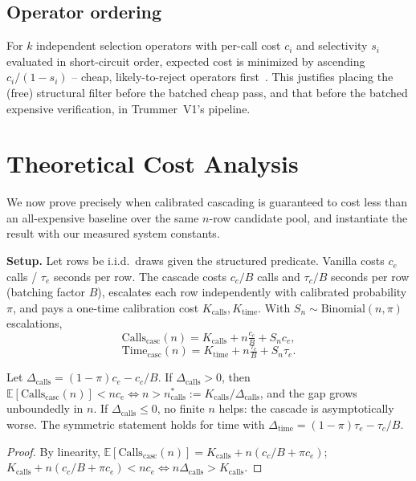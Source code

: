 \documentclass[sigconf,natbib=false]{acmart}
\begin{document}
\subsection{Operator ordering}
For $k$ independent selection operators with per-call cost $c_i$ and selectivity $s_i$ evaluated in short-circuit order, expected cost is minimized by ascending $c_i/(1-s_i)$ -- cheap, likely-to-reject operators first~\cite{eleet}. This justifies placing the (free) structural filter before the batched cheap pass, and that before the batched expensive verification, in Trummer~V1's pipeline.

\section{Theoretical Cost Analysis}
\label{sec:asymptotic-dominance}

We now prove precisely when calibrated cascading is guaranteed to cost less than an all-expensive baseline over the same $n$-row candidate pool, and instantiate the result with our measured system constants.

\textbf{Setup.} Let rows be i.i.d.\ draws given the structured predicate. Vanilla costs $c_e$ calls / $\tau_e$ seconds per row. The cascade costs $c_c/B$ calls and $\tau_c/B$ seconds per row (batching factor $B$), escalates each row independently with calibrated probability $\pi$, and pays a one-time calibration cost $K_{\mathrm{calls}}, K_{\mathrm{time}}$. With $S_n\sim\mathrm{Binomial}(n,\pi)$ escalations,
\[
  \mathrm{Calls}_{\mathrm{casc}}(n) = K_{\mathrm{calls}} + n\tfrac{c_c}{B} + S_n c_e,
\]
\[
  \mathrm{Time}_{\mathrm{casc}}(n) = K_{\mathrm{time}} + n\tfrac{\tau_c}{B} + S_n \tau_e.
\]

\begin{proposition}
\label{prop:crossover}
Let $\Delta_{\mathrm{calls}} = (1-\pi)c_e - c_c/B$. If $\Delta_{\mathrm{calls}}>0$, then $\mathbb E[\mathrm{Calls}_{\mathrm{casc}}(n)] < n c_e \iff n > n^\ast_{\mathrm{calls}} := K_{\mathrm{calls}}/\Delta_{\mathrm{calls}}$, and the gap grows unboundedly in $n$. If $\Delta_{\mathrm{calls}}\le 0$, no finite $n$ helps: the cascade is asymptotically worse. The symmetric statement holds for time with $\Delta_{\mathrm{time}}=(1-\pi)\tau_e-\tau_c/B$.
\end{proposition}
\begin{proof}
By linearity, $\mathbb E[\mathrm{Calls}_{\mathrm{casc}}(n)]=K_{\mathrm{calls}}+n(c_c/B+\pi c_e)$; $K_{\mathrm{calls}}+n(c_c/B+\pi c_e) < nc_e \iff n\Delta_{\mathrm{calls}} > K_{\mathrm{calls}}$.
\end{proof}
\end{document}

